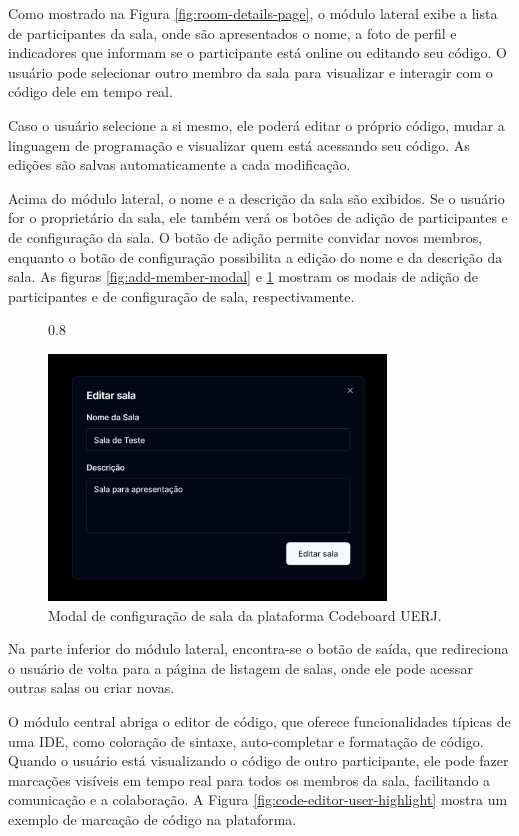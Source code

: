 Como mostrado na Figura \ref{fig:room-details-page}, o módulo lateral exibe a lista de participantes da sala, onde são apresentados o nome, a foto de perfil e indicadores que informam se o participante está online ou editando seu código. O usuário pode selecionar outro membro da sala para visualizar e interagir com o código dele em tempo real.

Caso o usuário selecione a si mesmo, ele poderá editar o próprio código, mudar a linguagem de programação e visualizar quem está acessando seu código. As edições são salvas automaticamente a cada modificação.

Acima do módulo lateral, o nome e a descrição da sala são exibidos. Se o usuário for o proprietário da sala, ele também verá os botões de adição de participantes e de configuração da sala. O botão de adição permite convidar novos membros, enquanto o botão de configuração possibilita a edição do nome e da descrição da sala. As figuras \ref{fig:add-member-modal} e \ref{fig:edit-room-modal} mostram os modais de adição de participantes e de configuração de sala, respectivamente.

\begin{figure}[H]{0.8\textwidth}
    \centering
    \caption{Modal de configuração de sala da plataforma Codeboard UERJ.}
    \label{fig:edit-room-modal}
    \includegraphics[width=0.8\textwidth]{assets/codeboard/edit-room-modal.png}
\end{figure}

Na parte inferior do módulo lateral, encontra-se o botão de saída, que redireciona o usuário de volta para a página de listagem de salas, onde ele pode acessar outras salas ou criar novas.

O módulo central abriga o editor de código, que oferece funcionalidades típicas de uma IDE, como coloração de sintaxe, auto-completar e formatação de código. Quando o usuário está visualizando o código de outro participante, ele pode fazer marcações visíveis em tempo real para todos os membros da sala, facilitando a comunicação e a colaboração. A Figura \ref{fig:code-editor-user-highlight} mostra um exemplo de marcação de código na plataforma.

